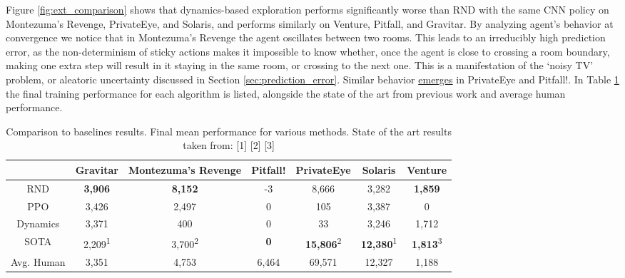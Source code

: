 \documentclass{article} %
\begin{document}
Figure \ref{fig:ext_comparison} shows that dynamics-based exploration performs significantly worse than RND with the same CNN policy on Montezuma's Revenge, PrivateEye, and Solaris, and performs similarly on Venture, Pitfall, and Gravitar. By analyzing agent's behavior at convergence we notice that in Montezuma's Revenge the agent oscillates between two rooms. This leads to an irreducibly high prediction error, as the non-determinism of sticky actions makes it impossible to know whether, once the agent is close to crossing a room boundary, making one extra step will result in it staying in the same room, or crossing to the next one. This is a manifestation of the `noisy TV' problem, or aleatoric uncertainty discussed in Section \ref{sec:prediction_error}. Similar behavior \href{https://github.com/openai/random-network-distillation}{emerges} in PrivateEye and Pitfall!. In Table \ref{table:baselines} the final training performance for each algorithm is listed, alongside the state of the art from previous work and average human performance.
\begin{table}[ht]
\centering
\tabcolsep=0.11cm
\begin{tabular}{c | c  c  c  c  c  c} 
            & Gravitar          & Montezuma's Revenge & Pitfall! & PrivateEye           & Solaris & Venture   \\ [0.5ex] 
 \hline
 RND    & \textbf{3,906}    &  \textbf{8,152}               &  -3      &  8,666               &  3,282    &   \textbf{1,859}   \\ 
 PPO    & 3,426              & 2,497                &  0       &  105                 &  3,387     &  0          \\
 Dynamics    & 3,371              & 400                &  0       &  33                 &  3,246     &  1,712          \\
 SOTA       & 2,209\textsuperscript{1}&3,700\textsuperscript{2}&\textbf{0}&\textbf{15,806}\textsuperscript{2}&\textbf{12,380}\textsuperscript{1}& \textbf{1,813}\textsuperscript{3}\\ \hline
 Avg. Human & 3,351          &  4,753              & 6,464    &69,571                & 12,327    &  1,188   \\ [1ex] 
\end{tabular}
\caption{Comparison to baselines results. Final mean performance for various methods. State of the art results taken from: [1] \citep{fortunato2017noisy} [2] \citep{bellemare2016unifying} [3] \citep{horgan2018distributed}}
\label{table:baselines}
\end{table}
\end{document}
